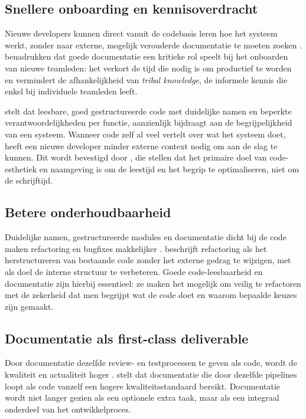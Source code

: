 \subsection{Snellere onboarding en kennisoverdracht}
Nieuwe developers kunnen direct vanuit de codebasis leren hoe het systeem werkt, zonder naar externe, mogelijk verouderde documentatie te moeten zoeken \autocite{bhatti2021docsdevelopers}.
\textcite{bhatti2021docsdevelopers} benadrukken dat goede documentatie een kritieke rol speelt bij het onboarden van nieuwe teamleden: het verkort de tijd die nodig is om productief te worden en vermindert de afhankelijkheid van \textit{tribal knowledge}, de informele kennis die enkel bij individuele teamleden leeft.

\textcite{martin2008clean} stelt dat leesbare, goed gestructureerde code met duidelijke namen en beperkte verantwoordelijkheden per functie, aanzienlijk bijdraagt aan de begrijpelijkheid van een systeem.
Wanneer code zelf al veel vertelt over wat het systeem doet, heeft een nieuwe developer minder externe context nodig om aan de slag te kunnen.
Dit wordt bevestigd door \textcite{boswell2011readablecode}, die stellen dat het primaire doel van code-esthetiek en naamgeving is om de leestijd en het begrip te optimaliseren, niet om de schrijftijd.

\subsection{Betere onderhoudbaarheid}
Duidelijke namen, gestructureerde modules en documentatie dicht bij de code maken refactoring en bugfixes makkelijker \autocite{fowler2018refactoring}.
\textcite{fowler2018refactoring} beschrijft refactoring als het herstructureren van bestaande code zonder het externe gedrag te wijzigen, met als doel de interne structuur te verbeteren.
Goede code-leesbaarheid en documentatie zijn hierbij essentieel: ze maken het mogelijk om veilig te refactoren met de zekerheid dat men begrijpt wat de code doet en waarom bepaalde keuzes zijn gemaakt.

\subsection{Documentatie als first-class deliverable}
Door documentatie dezelfde review- en testprocessen te geven als code, wordt de kwaliteit en actualiteit hoger \autocite{gentle2017docslikecode}.
\textcite{etter2016moderntechwriting} stelt dat documentatie die door dezelfde pipelines loopt als code vanzelf een hogere kwaliteitsstandaard bereikt.
Documentatie wordt niet langer gezien als een optionele extra taak, maar als een integraal onderdeel van het ontwikkelproces.

